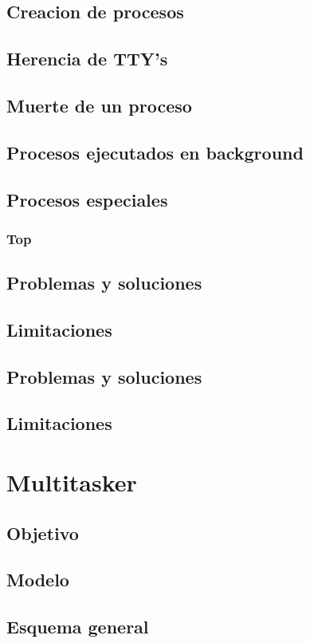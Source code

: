 \documentclass[10pt,a4paper]{article}
\begin{document}
	\subsection{Creacion de procesos}
	\subsection{Herencia de TTY's}
	\subsection{Muerte de un proceso}
	\subsection{Procesos ejecutados en background}
	\subsection{Procesos especiales}
	\subsubsection{Top}
	\subsection{Problemas y soluciones}
	\subsection{Limitaciones}
	\subsection{Problemas y soluciones}
	\subsection{Limitaciones}


\section{Multitasker}
	\subsection{Objetivo}
	\subsection{Modelo}
	\subsection{Esquema general}
\end{document}

